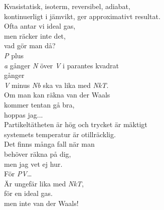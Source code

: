\documentclass[a6paper,10pt]{article}
\begin{document}
\setlength{\oddsidemargin}{-0.47in}

\begin{center}
\end{center}
\begin{lyrics}
Kvasistatisk, isoterm, reversibel, adiabat,\\
kontinuerligt i jämvikt, ger approximativt resultat.\\
Ofta antar vi ideal gas,\\
men räcker inte det, \\
vad gör man då?
\vspace{5pt}\\
\textit{P} plus \\
\textit{a} gånger \textit{N} över \textit{V} i parantes kvadrat\\
gånger \\
\textit{V} minus \textit{Nb} ska va lika med \textit{NkT}.\\
Om man kan räkna van der Waals\\
kommer tentan gå bra,\\
hoppas jag...
\vspace{5pt}\\
Partikeltätheten är hög och trycket är mäktigt\\
systemets temperatur är otillräcklig.\\
Det finns många fall när man\\
behöver räkna på dig,\\
men jag vet ej hur.
\vspace{5pt}\\
För \textit{PV}… \\
Är ungefär lika med \textit{NkT},\\
för en ideal gas.\\
men inte van der Waals!
\end{lyrics}

\setlength{\oddsidemargin}{-0.47in}
\end{document}
